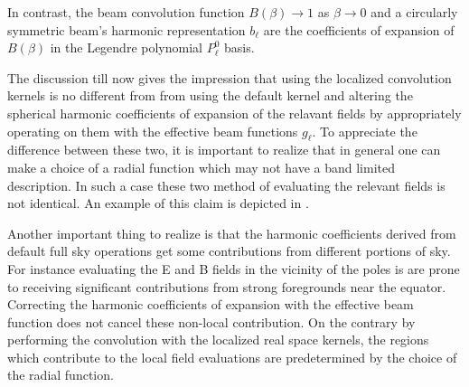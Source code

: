 In contrast,  the beam convolution function $B(\beta) \rightarrow 1$ as $\beta \rightarrow 0$ and a circularly symmetric beam's harmonic representation $b_{\ell}$ are the coefficients of expansion of $B(\beta)$ in the Legendre polynomial $P_{\ell}^0$ basis. 

The discussion till now gives the impression that using the localized convolution kernels is no different from from using the default kernel and altering the spherical harmonic coefficients of expansion of the relavant fields by appropriately operating on them with the  effective beam functions $g_{\ell}$. To appreciate the difference between these two, it is important to realize that in general one can make a choice of a radial function which may not have a band limited description. In such a case these two method of evaluating the relevant fields is not identical. An example of this claim is depicted in .  
%
\begin{figure}[!t] 
\centering
{}
\caption{}
\label{fig:example_gbeta}
\end{figure}
%

Another important thing to realize is that the harmonic coefficients derived from default full sky operations get some contributions from different portions of sky. For instance evaluating the E and B fields in the vicinity of the poles is are prone to receiving significant contributions from strong foregrounds near the equator. Correcting the harmonic coefficients of expansion with the effective beam function does not cancel these non-local contribution. On the contrary by performing the convolution with the localized real space kernels, the regions which contribute to the local field evaluations are predetermined by the choice of the radial function.


